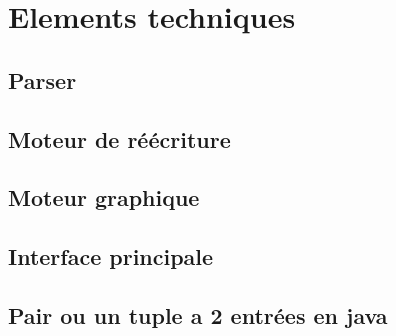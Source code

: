 \chapter{Elements techniques}
\section{Parser}\label{sec:parser}
\section{Moteur de réécriture}
\section{Moteur graphique}\label{src:interface3d}
\section{Interface principale}\label{sec:menu}
\section{Pair ou un tuple a 2 entrées en java}